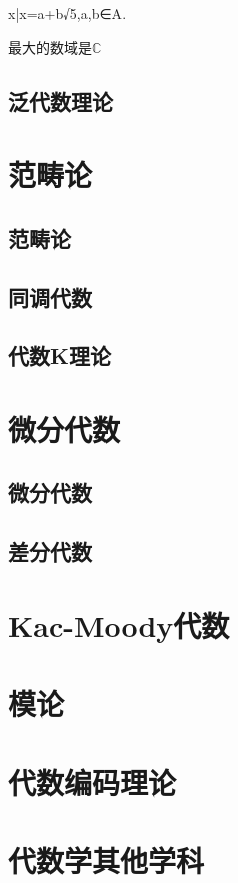 \documentclass[UTF8]{../09-Mathematics}
\begin{document}
{x|x=a+b√5,a,b∈A}.


最大的数域是$\mathbb{C}$

\section{泛代数理论}




\chapter{范畴论}
    \section{范畴论}
    \section{同调代数}
    \section{代数K理论}

\chapter{微分代数}
    \section{微分代数}
    \section{差分代数}

\chapter{Kac-Moody代数}



\chapter{模论}

\chapter{代数编码理论}
\chapter{代数学其他学科}
\end{document}
